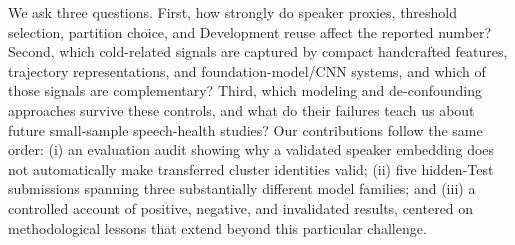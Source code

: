 We ask three questions. 
First, how strongly do speaker proxies, threshold selection, partition choice, and Development reuse affect the reported number? 
Second, which cold-related signals are captured by compact handcrafted features, trajectory representations, and foundation-model/CNN systems, and which of those signals are complementary? 
Third, which modeling and de-confounding approaches survive these controls, and what do their failures teach us about future small-sample speech-health studies? 
Our contributions follow the same order: 
(i) an evaluation audit showing why a validated speaker embedding does not automatically make transferred cluster identities valid; 
(ii) five hidden-Test submissions spanning three substantially different model families; and 
(iii) a controlled account of positive, negative, and invalidated results, centered on methodological lessons that extend beyond this particular challenge.
